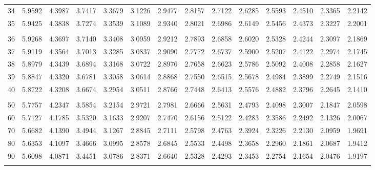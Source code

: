 {\begin{tabular}{l|lllllllllllll}
 34 & 5.9592 & 4.3987 & 3.7417 & 3.3679 & 3.1226 & 2.9477 & 2.8157 & 2.7122 & 2.6285 & 2.5593 & 2.4510 & 2.3365 & 2.2142 \\[5pt] \arrayrulecolor{light-gray}\hline\arrayrulecolor{black}  
 35 & 5.9425 & 4.3838 & 3.7274 & 3.3539 & 3.1089 & 2.9340 & 2.8021 & 2.6986 & 2.6149 & 2.5456 & 2.4373 & 2.3227 & 2.2001 \\[5pt] \arrayrulecolor{light-gray}\hline\arrayrulecolor{black}  
\\ 
 36 & 5.9268 & 4.3697 & 3.7140 & 3.3408 & 3.0959 & 2.9212 & 2.7893 & 2.6858 & 2.6020 & 2.5328 & 2.4244 & 2.3097 & 2.1869 \\[5pt] \arrayrulecolor{light-gray}\hline\arrayrulecolor{black}  
 37 & 5.9119 & 4.3564 & 3.7013 & 3.3285 & 3.0837 & 2.9090 & 2.7772 & 2.6737 & 2.5900 & 2.5207 & 2.4122 & 2.2974 & 2.1745 \\[5pt] \arrayrulecolor{light-gray}\hline\arrayrulecolor{black}  
 38 & 5.8979 & 4.3439 & 3.6894 & 3.3168 & 3.0722 & 2.8976 & 2.7658 & 2.6623 & 2.5786 & 2.5092 & 2.4008 & 2.2858 & 2.1627 \\[5pt] \arrayrulecolor{light-gray}\hline\arrayrulecolor{black}  
 39 & 5.8847 & 4.3320 & 3.6781 & 3.3058 & 3.0614 & 2.8868 & 2.7550 & 2.6515 & 2.5678 & 2.4984 & 2.3899 & 2.2749 & 2.1516 \\[5pt] \arrayrulecolor{light-gray}\hline\arrayrulecolor{black}  
 40 & 5.8722 & 4.3208 & 3.6674 & 3.2954 & 3.0511 & 2.8766 & 2.7448 & 2.6413 & 2.5576 & 2.4882 & 2.3796 & 2.2645 & 2.1410 \\[5pt] \arrayrulecolor{light-gray}\hline\arrayrulecolor{black}  
\\ 
 50 & 5.7757 & 4.2347 & 3.5854 & 3.2154 & 2.9721 & 2.7981 & 2.6666 & 2.5631 & 2.4793 & 2.4098 & 2.3007 & 2.1847 & 2.0598 \\[5pt] \arrayrulecolor{light-gray}\hline\arrayrulecolor{black}  
 60 & 5.7127 & 4.1785 & 3.5320 & 3.1633 & 2.9207 & 2.7470 & 2.6156 & 2.5122 & 2.4283 & 2.3586 & 2.2492 & 2.1326 & 2.0067 \\[5pt] \arrayrulecolor{light-gray}\hline\arrayrulecolor{black}  
 70 & 5.6682 & 4.1390 & 3.4944 & 3.1267 & 2.8845 & 2.7111 & 2.5798 & 2.4763 & 2.3924 & 2.3226 & 2.2130 & 2.0959 & 1.9691 \\[5pt] \arrayrulecolor{light-gray}\hline\arrayrulecolor{black}  
 80 & 5.6353 & 4.1097 & 3.4666 & 3.0995 & 2.8578 & 2.6845 & 2.5533 & 2.4498 & 2.3658 & 2.2960 & 2.1861 & 2.0687 & 1.9412 \\[5pt] \arrayrulecolor{light-gray}\hline\arrayrulecolor{black}  
 90 & 5.6098 & 4.0871 & 3.4451 & 3.0786 & 2.8371 & 2.6640 & 2.5328 & 2.4293 & 2.3453 & 2.2754 & 2.1654 & 2.0476 & 1.9197 \\[5pt] \arrayrulecolor{light-gray}\hline\arrayrulecolor{black}  

\end{tabular}}
